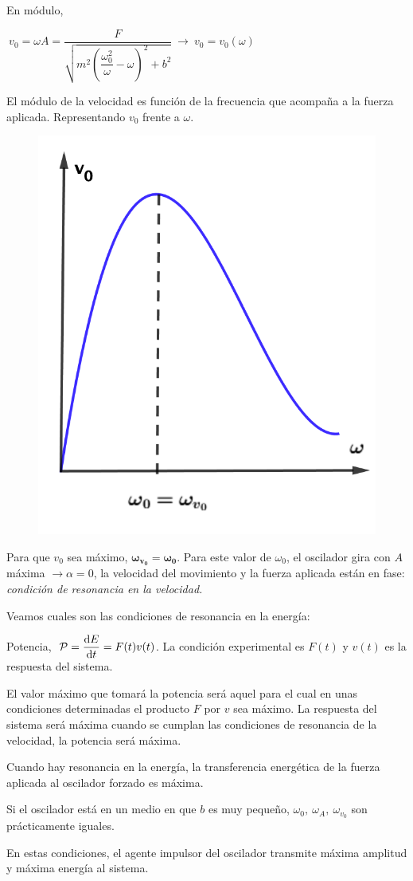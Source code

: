 \begin{multicols}{2}
En módulo, 

$\ v_0=\omega A=\dfrac{F}{\sqrt{m^2 \left( \dfrac{\omega_0^2}{\omega}-\omega \right)^2+b^2}} \ \to \ v_0=v_0(\omega)$

El módulo de la velocidad es función de la frecuencia que acompaña a la fuerza aplicada. Representando $v_0$ frente a $\omega$.

\begin{figure}[H]
		\centering
		\includegraphics[width=.4\textwidth]{imagenes/imagenes20/T20IM09.png}
	\end{figure}	
\end{multicols}
Para que $v_0$ sea máximo, $\boldsymbol{ \omega_{v_0}=\omega_0 }$. Para este valor de $\omega_0$, el oscilador gira con $A$ máxima $\to \alpha=0$, la velocidad del movimiento y la fuerza aplicada están en fase: \emph{condición de resonancia en la velocidad.}

Veamos cuales son las condiciones de resonancia en la energía:

Potencia, $\ \mathcal P=\displaystyle \dv{E}{t}=F(t)v(t)$. La condición experimental es $F(t)$ y $v(t)$ es la respuesta del sistema.

El valor máximo que tomará la potencia será aquel para el cual en unas condiciones determinadas el producto $F$ por $v$ sea máximo. La respuesta del sistema será máxima cuando se cumplan las condiciones de resonancia de la velocidad, la potencia será máxima.

Cuando hay resonancia en la energía, la transferencia energética de la fuerza aplicada al oscilador forzado es máxima.

Si el oscilador está en un medio en que $b$ es muy pequeño, $\omega_0, \ \omega_A, \ \omega_{v_0}$ son prácticamente iguales.

En estas condiciones, el agente impulsor del oscilador transmite máxima amplitud y máxima energía al sistema.


